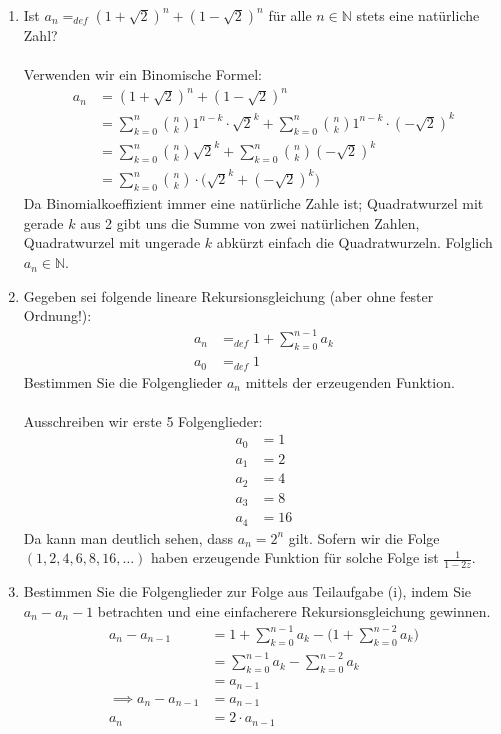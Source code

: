 \begin{enumerate}[label=(\alph*)]
        \item Ist $a_n =_{def} (1+\sqrt 2)^n+(1-\sqrt 2)^n$ für alle $n\in \mathbb{N}$ stets eine natürliche Zahl?\\\\
        Verwenden wir ein Binomische Formel:
        \begin{align*}
            a_n &= (1+\sqrt 2)^n+(1-\sqrt 2)^n \\
            &=\sum_{k=0}^{n} \binom{n}{k} 1^{n-k}\cdot\sqrt{2}^k +
            \sum_{k=0}^{n} \binom{n}{k} 1^{n-k}\cdot(-\sqrt{2})^k \\
            &= \sum_{k=0}^{n} \binom{n}{k}\sqrt{2}^k +
            \sum_{k=0}^{n} \binom{n}{k}(-\sqrt{2})^k \\
            &= \sum_{k=0}^{n} \binom{n}{k}\cdot\big(\sqrt{2}^k + (-\sqrt{2})^k\big)
        \end{align*}
        Da Binomialkoeffizient immer eine natürliche Zahle ist; Quadratwurzel mit gerade $k$ aus 2 
        gibt uns die Summe von zwei natürlichen Zahlen, Quadratwurzel mit ungerade $k$ abkürzt einfach
        die Quadratwurzeln. Folglich $a_n \in \mathbb{N}$.

        \item Gegeben sei folgende lineare Rekursionsgleichung (aber ohne fester Ordnung!):
        \begin{align*}
            a_n &=_{def} 1 + \sum_{k=0}^{n-1} a_k \\
            a_0 &=_{def} 1
        \end{align*}
        Bestimmen Sie die Folgenglieder $a_n$ mittels der erzeugenden Funktion.\\\\
        Ausschreiben wir erste 5 Folgenglieder:
        \begin{align*}
            a_0 &= 1\\
            a_1 &= 2\\
            a_2 &= 4\\
            a_3 &= 8\\
            a_4 &= 16
        \end{align*}
        Da kann man deutlich sehen, dass $a_n = 2^n$ gilt. Sofern wir die Folge $(1,2,4,6,8,16,\ldots)$
        haben erzeugende Funktion für solche Folge ist $\displaystyle\frac{1}{1-2z}$.

        \item Bestimmen Sie die Folgenglieder zur Folge aus Teilaufgabe (i), indem Sie $a_n - a_n-1$
        betrachten und eine einfacherere Rekursionsgleichung gewinnen.
        \begin{align*}
            a_n - a_{n-1} &= 1+\sum_{k=0}^{n-1} a_k - \Big(1+\sum_{k=0}^{n-2} a_k\Big) \\
            &= \sum_{k=0}^{n-1} a_k - \sum_{k=0}^{n-2} a_k \\
            &= a_{n-1} \\
            \implies a_n - a_{n-1} &= a_{n-1} \\
            a_n &= 2\cdot a_{n-1}
        \end{align*}
    \end{enumerate}
